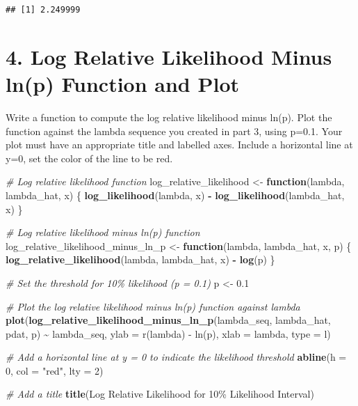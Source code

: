 \documentclass[
]{article}
\newenvironment{Shaded}{\begin{snugshade}}{\end{snugshade}}
\newcommand{\AttributeTok}[1]{\textcolor[rgb]{0.13,0.29,0.53}{#1}}
\newcommand{\CommentTok}[1]{\textcolor[rgb]{0.56,0.35,0.01}{\textit{#1}}}
\newcommand{\ControlFlowTok}[1]{\textcolor[rgb]{0.13,0.29,0.53}{\textbf{#1}}}
\newcommand{\DecValTok}[1]{\textcolor[rgb]{0.00,0.00,0.81}{#1}}
\newcommand{\FloatTok}[1]{\textcolor[rgb]{0.00,0.00,0.81}{#1}}
\newcommand{\FunctionTok}[1]{\textcolor[rgb]{0.13,0.29,0.53}{\textbf{#1}}}
\newcommand{\NormalTok}[1]{#1}
\newcommand{\OtherTok}[1]{\textcolor[rgb]{0.56,0.35,0.01}{#1}}
\newcommand{\SpecialCharTok}[1]{\textcolor[rgb]{0.81,0.36,0.00}{\textbf{#1}}}
\newcommand{\StringTok}[1]{\textcolor[rgb]{0.31,0.60,0.02}{#1}}
\begin{document}
\begin{verbatim}
## [1] 2.249999
\end{verbatim}

\hypertarget{log-relative-likelihood-minus-lnp-function-and-plot}{%
\section{4. Log Relative Likelihood Minus ln(p) Function and
Plot}\label{log-relative-likelihood-minus-lnp-function-and-plot}}

Write a function to compute the log relative likelihood minus ln(p).
Plot the function against the lambda sequence you created in part 3,
using p=0.1. Your plot must have an appropriate title and labelled axes.
Include a horizontal line at y=0, set the color of the line to be red.

\begin{Shaded}
\begin{Highlighting}[]
\CommentTok{\# Log relative likelihood function}
\NormalTok{log\_relative\_likelihood }\OtherTok{\textless{}{-}} \ControlFlowTok{function}\NormalTok{(lambda, lambda\_hat, x) \{}
  \FunctionTok{log\_likelihood}\NormalTok{(lambda, x) }\SpecialCharTok{{-}} \FunctionTok{log\_likelihood}\NormalTok{(lambda\_hat, x)}
\NormalTok{\}}

\CommentTok{\# Log relative likelihood minus ln(p) function}
\NormalTok{log\_relative\_likelihood\_minus\_ln\_p }\OtherTok{\textless{}{-}} \ControlFlowTok{function}\NormalTok{(lambda, lambda\_hat, x, p) \{}
  \FunctionTok{log\_relative\_likelihood}\NormalTok{(lambda, lambda\_hat, x) }\SpecialCharTok{{-}} \FunctionTok{log}\NormalTok{(p)}
\NormalTok{\}}

\CommentTok{\# Set the threshold for 10\% likelihood (p = 0.1)}
\NormalTok{p }\OtherTok{\textless{}{-}} \FloatTok{0.1}

\CommentTok{\# Plot the log relative likelihood minus ln(p) function against lambda}
\FunctionTok{plot}\NormalTok{(}\FunctionTok{log\_relative\_likelihood\_minus\_ln\_p}\NormalTok{(lambda\_seq, lambda\_hat, pdat, p) }\SpecialCharTok{\textasciitilde{}}\NormalTok{ lambda\_seq, }
     \AttributeTok{ylab =} \StringTok{\textquotesingle{}r(lambda) {-} ln(p)\textquotesingle{}}\NormalTok{, }\AttributeTok{xlab =} \StringTok{\textquotesingle{}lambda\textquotesingle{}}\NormalTok{, }\AttributeTok{type =} \StringTok{\textquotesingle{}l\textquotesingle{}}\NormalTok{)}

\CommentTok{\# Add a horizontal line at y = 0 to indicate the likelihood threshold}
\FunctionTok{abline}\NormalTok{(}\AttributeTok{h =} \DecValTok{0}\NormalTok{, }\AttributeTok{col =} \StringTok{"red"}\NormalTok{, }\AttributeTok{lty =} \DecValTok{2}\NormalTok{)}

\CommentTok{\# Add a title}
\FunctionTok{title}\NormalTok{(}\StringTok{\textquotesingle{}Log Relative Likelihood for 10\% Likelihood Interval\textquotesingle{}}\NormalTok{)}
\end{Highlighting}
\end{Shaded}
\end{document}
